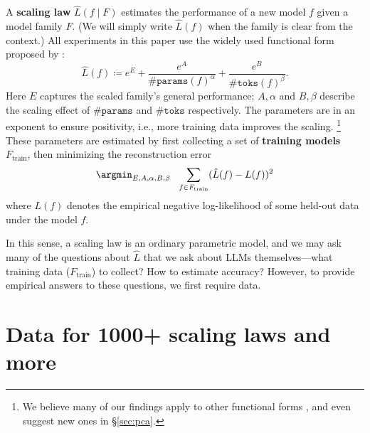 \documentclass{article}
\theoremstyle{plain}
\theoremstyle{definition}
\theoremstyle{remark}
\newcommand{\mathmsize}{\#\texttt{params}}
\newcommand{\mathtokens}{\#\texttt{toks}}
\newcommand{\mathperf}{L}
\newcommand{\msize}{$\mathmsize{}$}
\newcommand{\tokens}{$\mathtokens{}$}
\newcommand{\xmodel}{f}
\newcommand{\xfamily}{F}
\newcommand{\xtrain}{F_\mathrm{train}}
\begin{document}
A \textbf{scaling law} $\hat{L}(\xmodel \mid \xfamily)$ 
estimates the performance of a new model $\xmodel$ given a model family $\xfamily$. (We will simply write $\hat{L}(\xmodel)$ when the family is clear from the context.)
All experiments in this paper use the widely used functional form proposed by \citet{hoffmann2022training}: 
\begin{equation}
 \hat {L}(\xmodel) \coloneqq 
 e^{E} + \frac{e^{A}}{\mathmsize{}(\xmodel)^\alpha} + \frac{e^{B}}{\mathtokens{}(\xmodel)^\beta}.
 \label{eq:scaling}
\end{equation}
Here $E$ captures the scaled family's general performance; $A, \alpha$ and $B, \beta$ describe the scaling effect of \msize{} and \tokens{} respectively. The parameters are in an exponent to ensure positivity, i.e., more training data improves the scaling. \footnote{
We believe many of our findings apply to other functional forms \citep{caballerobroken}, and even suggest new ones in \S\ref{sec:pca}.
}
These parameters are estimated by first collecting a set of \textbf{training models} $\xtrain$, then
minimizing the reconstruction error
\[
    \argmin_{E, A, \alpha, B, \beta} ~~ \sum_{\xmodel \in \xtrain} (\hat{L}(\xmodel) - \mathperf(\xmodel) )^2
\]
where $\mathperf(\xmodel)$ denotes the empirical negative log-likelihood of some held-out data under the model $\xmodel$.

In this sense, a scaling law is an ordinary parametric model, and we may ask many of the questions about $\hat{L}$ that we ask about LLMs themselves---what training data ($\xtrain$) to collect? How to estimate accuracy? However, to provide empirical answers to these questions, we first require data.

\section{Data for 1000+ scaling laws and more}\label{sec:data}
\end{document}
